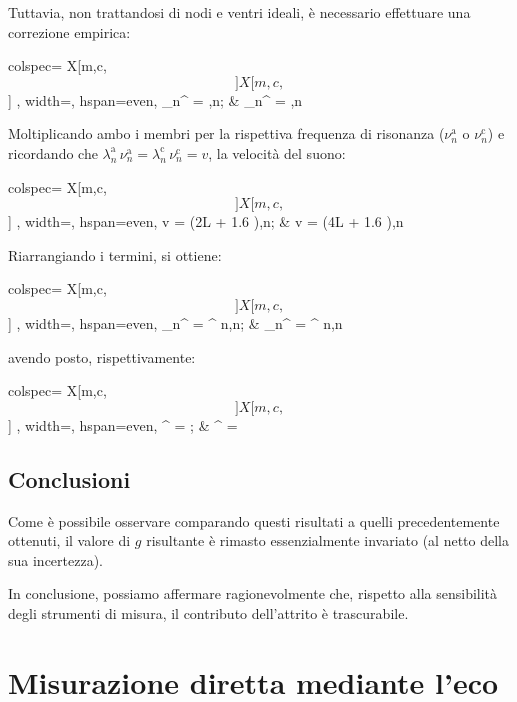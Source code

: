\documentclass{article}
\newcommand*{\diam}{\varnothing}
\begin{document}
Tuttavia, non trattandosi di nodi e ventri ideali, è necessario effettuare
una correzione empirica:

\noindent
\begin{tblr}{
  colspec={ X[m,c,$$]X[m,c,$$] },
  width=\textwidth,
  hspan=even,
}
  \lambda_n^ = \frac{2L + 1.6 \diam}{n},\quad n\in{};
  &
  \lambda_n^ = \frac{4L + 1.6 \diam}{n},\quad n\in{}\;
\end{tblr}
Moltiplicando ambo i membri per la rispettiva frequenza di risonanza
($\nu_n^\text{a}$ o $\nu_n^\text{c}$)
e ricordando che $\lambda_n^\text{a}\,\nu_n^\text{a} =
\lambda_n^\text{c}\,\nu_n^\text{c} = v$, la velocità del suono:

\noindent
\begin{tblr}{
  colspec={ X[m,c,$$]X[m,c,$$] },
  width=\textwidth,
  hspan=even,
}
  v = (2L + 1.6 \diam),\quad n\in{};
  &
  v = (4L + 1.6 \diam),\quad n\in{}\;
\end{tblr}
Riarrangiando i termini, si ottiene:

\noindent
\begin{tblr}{
  colspec={ X[m,c,$$]X[m,c,$$] },
  width=\textwidth,
  hspan=even,
}
  \nu_n^ = \xi^ n,\quad n\in{};
  &
  \nu_n^ = \xi^ n,\quad n\in{}\;
\end{tblr}
avendo posto, rispettivamente:

\noindent
\begin{tblr}{
  colspec={ X[m,c,$$]X[m,c,$$] },
  width=\textwidth,
  hspan=even,
}
  \xi^ = \frac{v}{2L + 1.6 \diam};
  &
  \xi^ = \frac{v}{4L + 1.6 \diam}
\end{tblr}


\subsection{Conclusioni}

Come è possibile osservare comparando questi risultati a
quelli precedentemente ottenuti, il valore di $g$ risultante
è rimasto essenzialmente invariato (al netto della sua incertezza).

In conclusione, possiamo affermare ragionevolmente che,
rispetto alla sensibilità degli strumenti di misura,
il contributo dell'attrito è trascurabile.

\section{Misurazione diretta mediante l'eco}
\end{document}
